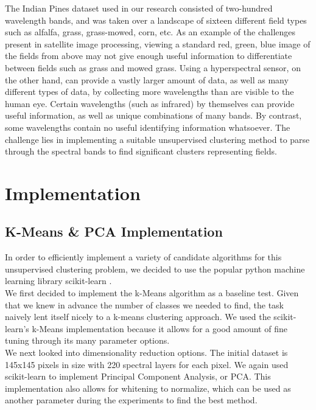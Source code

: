 \documentclass[journal]{IEEEtran}
\begin{document}
The Indian Pines \cite{IndianPines} dataset used in our research consisted of two-hundred wavelength bands, and was taken over a landscape of sixteen different field types such as alfalfa, grass, grass-mowed, corn, etc. As an example of the challenges present in satellite image processing, viewing a standard red, green, blue image of the fields from above may not give enough useful information to differentiate between fields such as grass and mowed grass. Using a hyperspectral sensor, on the other hand, can provide a vastly larger amount of data, as well as many different types of data, by collecting more wavelengths than are visible to the human eye. Certain wavelengths (such as infrared) by themselves can provide useful information, as well as unique combinations of many bands. By contrast, some wavelengths contain no useful identifying information whatsoever. The challenge lies in implementing a suitable unsupervised clustering method to parse through the spectral bands to find significant clusters representing fields.\\



\section{Implementation}
  \subsection{K-Means \& PCA Implementation}
    In order to efficiently implement a variety of candidate algorithms for this unsupervised clustering problem, we decided to use the popular python machine learning library scikit-learn \cite{ScikitLearnAPI}.\\

    We first decided to implement the k-Means algorithm as a baseline test. Given that we knew in advance the number of classes we needed to find, the task naively lent itself nicely to a k-means clustering approach. We used the scikit-learn's k-Means \cite{ScikitLearnAPI} implementation because it allows for a good amount of fine tuning through its many parameter options.\\

    We next looked into dimensionality reduction options. The initial dataset is 145x145 pixels in size with 220 spectral layers for each pixel. We again used scikit-learn to implement Principal Component Analysis, or PCA. This implementation also allows for whitening to normalize, which can be used as another parameter during the experiments to find the best method.\\
\end{document}
